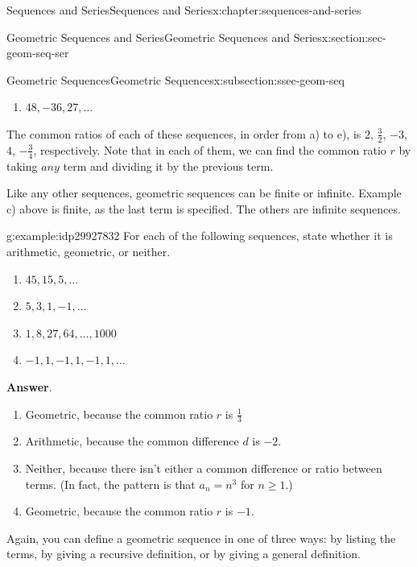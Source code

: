 \documentclass[twoside,10pt,]{book}
\newcommand{\blocktitlefont}{\relax}
\numberwithin{equation}{section}
\begin{document}
\begin{chapterptx}{Sequences and Series}{}{Sequences and Series}{}{}{x:chapter:sequences-and-series}
\begin{sectionptx}{Geometric Sequences and Series}{}{Geometric Sequences and Series}{}{}{x:section:sec-geom-seq-ser}
\begin{subsectionptx}{Geometric Sequences}{}{Geometric Sequences}{}{}{x:subsection:ssec-geom-seq}
\begin{enumerate}[label=(\alph*)]
\item{}\(\displaystyle 48, -36, 27, \ldots\)%
\end{enumerate}
%
\par
The common ratios of each of these sequences, in order from a) to e), is \(2\), \(\frac{3}{2}\), \(-3\), \(4\), \(-\frac{3}{4}\), respectively.  Note that in each of them, we can find the common ratio \(r\) by taking \(any\) term and dividing it by the previous term.%
\par
Like any other sequences, geometric sequences can be finite or infinite.  Example c) above is finite, as the last term is specified.  The others are infinite sequences. \begin{example}{}{g:example:idp29927832}%
For each of the following sequences, state whether it is arithmetic, geometric, or neither. %
\begin{enumerate}[label=(\alph*)]
\item{}\(\displaystyle 45, 15, 5, \ldots\)%
\item{}\(\displaystyle 5, 3, 1, -1, \ldots\)%
\item{}\(\displaystyle 1, 8, 27, 64, \ldots , 1000\)%
\item{}\(\displaystyle -1, 1, -1, 1, -1, 1, \ldots\)%
\end{enumerate}
\par\smallskip%
\noindent\textbf{\blocktitlefont Answer}.\label{g:answer:idp29937560}{}\hypertarget{g:answer:idp29937560}{}\quad{}%
\begin{enumerate}[label=(\alph*)]
\item{}Geometric, because the common ratio \(r\) is \(\frac{1}{3}\)%
\item{}Arithmetic, because the common difference \(d\) is \(-2\).%
\item{}Neither, because there isn't either a common difference or ratio between terms.  (In fact, the pattern is that \(a_n = n^3\) for \(n \ge 1\).)%
\item{}Geometric, because the common ratio \(r\) is \(-1\).%
\end{enumerate}
\end{example}
%
\par
Again, you can define a geometric sequence in one of three ways:  by listing the terms, by giving a recursive definition, or by giving a general definition.%
\end{subsectionptx}
%
%
\typeout{************************************************}

\end{sectionptx}
\end{chapterptx}
\end{document}
